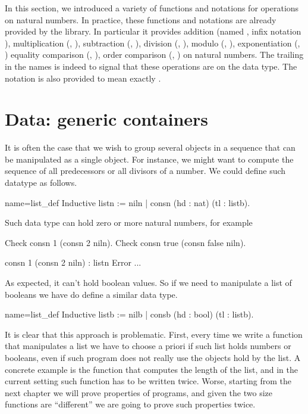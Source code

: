 In this section, we introduced a variety of functions and notations
for operations on natural numbers.  In practice, these functions and
notations are already provided by the \mcbMC{} library.  In particular
it provides addition (named , infix notation \C{+}), 
multiplication
(, \C{*}), subtraction (, \C{-}), division (,
\C{\%/}),  modulo (, \C{\%\%}), exponentiation (, \C{\^})
equality comparison (, \C{==}), order
comparison (, \C{<=}) on natural numbers.  The trailing  in
the names is indeed to signal that these operations are on the  data
type.
The notation  is also provided to mean exactly .

\section{Data: generic containers}

It is often the case that we wish to group several objects in a
sequence that can be manipulated as a single object.  For instance, we
might want to compute the sequence of all predecessors or all divisors
of a number.  We could define such datatype as follows.

\begin{coq}{name=list_def}{}
Inductive listn := niln | consn (hd : nat) (tl : listb).
\end{coq}

Such data type can hold zero or more natural numbers, for example

\begin{coq}{}{}
Check consn 1 (consn 2 niln).
Check consn true (consn false niln).
\end{coq}{}{}
\begin{coqout}{}{}
 consn 1 (consn 2 niln) : listn
 Error ...
\end{coqout}{}{}

As expected, it can't hold boolean values.  So if we need to
manipulate a list of booleans we have do define a similar data type.

\begin{coq}{name=list_def}{}
Inductive listb := nilb | consb (hd : bool) (tl : listb).
\end{coq}

It is clear that this approach is problematic.  First, every time we
write a function that manipulates a list we have to choose a priori
if such list holds numbers or booleans, even if such program does not
really use the objects hold by the list.
A concrete example is the function that computes the length of the list,
and in the current setting such function has to be written twice.
Worse, starting from the next chapter we will prove properties of programs,
and given the two size functions are ``different'' we are going to prove such
properties twice.

